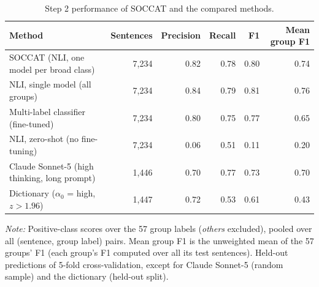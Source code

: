 \begin{table}[htb]
\centering
\scriptsize
\begin{threeparttable}
\caption{Step 2 performance of SOCCAT and the compared methods.}
\label{tab:model-comparison-overview}
\begin{tabular}{l r r r r r}
\toprule
Method & Sentences & Precision & Recall & F1 & Mean group F1 \\
\midrule
SOCCAT (NLI, one model per broad class) & 7,234 & 0.82 & 0.78 & 0.80 & 0.74 \\
\midrule
NLI, single model (all groups) & 7,234 & 0.84 & 0.79 & 0.81 & 0.76 \\
Multi-label classifier (fine-tuned) & 7,234 & 0.80 & 0.75 & 0.77 & 0.65 \\
NLI, zero-shot (no fine-tuning) & 7,234 & 0.06 & 0.51 & 0.11 & 0.20 \\
Claude Sonnet-5 (high thinking, long prompt) & 1,446 & 0.70 & 0.77 & 0.73 & 0.70 \\
Dictionary ($\alpha_0$ = high, $z > 1.96$) & 1,447 & 0.72 & 0.53 & 0.61 & 0.43 \\
\bottomrule
\end{tabular}
\begin{tablenotes}[flushleft]
\footnotesize
\item \textit{Note:} Positive-class scores over the 57 group labels (\textit{others} excluded), pooled over all (sentence, group label) pairs. Mean group F1 is the unweighted mean of the 57 groups' F1 (each group's F1 computed over all its test sentences). Held-out predictions of 5-fold cross-validation, except for Claude Sonnet-5 (random sample) and the dictionary (held-out split).
\end{tablenotes}
\end{threeparttable}
\end{table}
